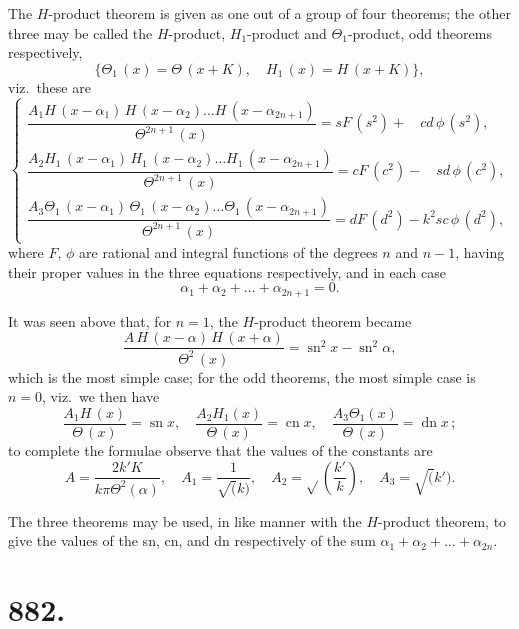 \documentclass[11pt,a4paper]{book}
\begin{document}
The $H$-product theorem is given as one out of a group of four theorems; the other three may be called the $H$-product, $H_1$-product and $\Theta_1$-product, odd theorems respectively,
\[ \{\Theta_1\,(x) = \Theta\,(x+K),\quad H_1\,(x) = H\,(x+K)\}, \]
viz.\ these are
\[
\begin{cases}
\dfrac{A_1 H\,(x-\alpha_1)\, H\,(x-\alpha_2) \ldots H\,(x-\alpha_{2n+1})}{\Theta^{2n+1}\,(x)} = sF\,(s^2) + \phantom{k^2} cd\, \phi\, (s^2), \\[8pt]
\dfrac{A_2 H_1\,(x-\alpha_1)\, H_1\,(x-\alpha_2) \ldots H_1\,(x-\alpha_{2n+1})}{\Theta^{2n+1}\,(x)} = cF\,(c^2) - \phantom{k^2} sd\, \phi\, (c^2), \\[8pt]
\dfrac{A_3 \Theta_1\,(x-\alpha_1)\, \Theta_1\,(x-\alpha_2) \ldots \Theta_1\,(x-\alpha_{2n+1})}{\Theta^{2n+1}\,(x)} = dF\,(d^2) - k^2 sc\, \phi\, (d^2),
\end{cases}
\]
where $F$, $\phi$ are rational and integral functions of the degrees $n$ and $n-1$, having their proper values in the three equations respectively, and in each case
\[ \alpha_1 + \alpha_2 + \ldots + \alpha_{2n+1} = 0. \]

It was seen above that, for $n=1$, the $H$-product theorem became
\[ \frac{A\, H\,(x-\alpha)\, H\,(x+\alpha)}{\Theta^2\,(x)} = \operatorname{sn}^2 x - \operatorname{sn}^2 \alpha, \]
which is the most simple case; for the odd theorems, the most simple case is $n=0$, viz.\ we then have
\[ \frac{A_1 H\,(x)}{\Theta\,(x)} = \operatorname{sn} x,\quad \frac{A_2 H_1(x)}{\Theta\,(x)} = \operatorname{cn} x,\quad \frac{A_3 \Theta_1(x)}{\Theta\,(x)} = \operatorname{dn} x\,; \]
to complete the formulae observe that the values of the constants are
\[ A = \frac{2k'K}{k\pi \Theta^2(\alpha)},\quad A_1 = \frac{1}{\surd(k)},\quad A_2 = \surd\!\left(\frac{k'}{k}\right),\quad A_3 = \surd(k'). \]

The three theorems may be used, in like manner with the $H$-product theorem, to give the values of the sn, cn, and dn respectively of the sum $\alpha_1 + \alpha_2 + \ldots + \alpha_{2n}$.


\newpage
\section*{882.}
\end{document}

